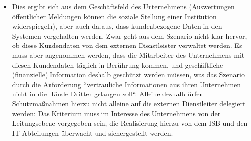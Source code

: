 \begin{itemize}
    \item[] Dies ergibt sich aus dem Geschäftsfeld des Unternehmens (Auswertungen öffentlicher Meldungen können die soziale Stellung einer Institution widerspiegeln), aber auch daraus, dass kundenbezogene Daten in den Systemen vorgehalten werden. Zwar geht aus dem Szenario nicht klar hervor, ob diese Kundendaten von dem externen Dienstleister verwaltet werden. Es muss aber angenommen werden, dass die Mitarbeiter des Unternehmens mit diesen Kundendaten täglich in Berührung kommen, und geschäftliche (finanzielle) Information deshalb geschützt werden müssen, was das Szenario durch die Anforderung ``vertrauliche Informationen aus ihren Unternehmen nicht in die Hände Dritter gelangen soll``. Alleine deshalb ürfen Schutzmaßnahmen hierzu nicht alleine auf die externen Dienstleiter delegiert werden: Das Kriterium muss im Interesse des Unternehmens von der Leitungsebene vorgegeben sein, die Realisierung hierzu von dem ISB und den IT-Abteilungen überwacht und sichergestellt werden.
\end{itemize}

